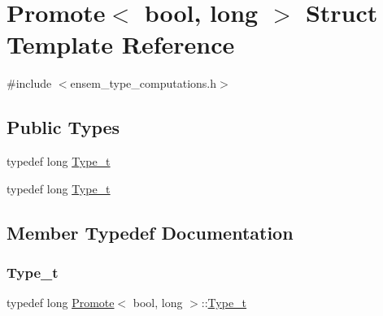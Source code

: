\hypertarget{structPromote_3_01bool_00_01long_01_4}{}\section{Promote$<$ bool, long $>$ Struct Template Reference}
\label{structPromote_3_01bool_00_01long_01_4}


{\ttfamily \#include $<$ensem\+\_\+type\+\_\+computations.\+h$>$}

\subsection*{Public Types}
\begin{DoxyCompactItemize}
\item 
typedef long \mbox{\hyperlink{structPromote_3_01bool_00_01long_01_4_acd7afc9445455e248d40955c9a61e0d3}{Type\+\_\+t}}
\item 
typedef long \mbox{\hyperlink{structPromote_3_01bool_00_01long_01_4_acd7afc9445455e248d40955c9a61e0d3}{Type\+\_\+t}}
\end{DoxyCompactItemize}


\subsection{Member Typedef Documentation}
\mbox{\label{structPromote_3_01bool_00_01long_01_4_acd7afc9445455e248d40955c9a61e0d3}} 
\subsubsection{\texorpdfstring{Type\_t}{Type\_t}\hspace{0.1cm}{\footnotesize\ttfamily [1/2]}}
{\footnotesize\ttfamily typedef long \mbox{\hyperlink{structPromote}{Promote}}$<$ bool, long $>$\+::\mbox{\hyperlink{structPromote_3_01bool_00_01long_01_4_acd7afc9445455e248d40955c9a61e0d3}{Type\+\_\+t}}}

\mbox{\label{structPromote_3_01bool_00_01long_01_4_acd7afc9445455e248d40955c9a61e0d3}} 
